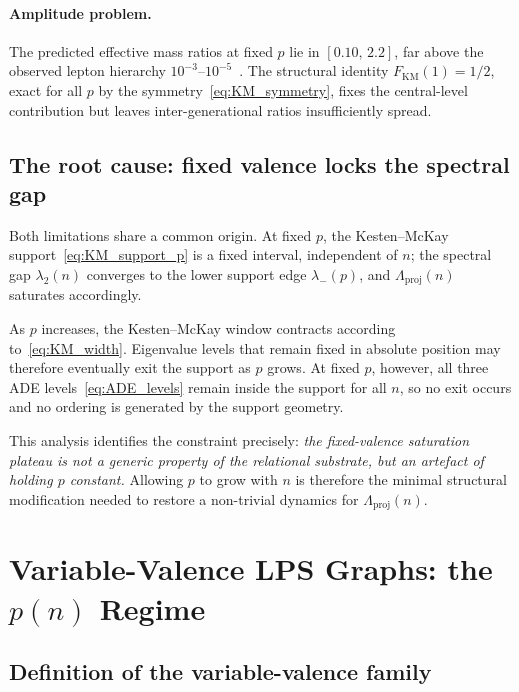 \documentclass[11pt]{article}
\newcommand{\Lproj}{\Lambda_{\mathrm{proj}}}
\newcommand{\FKM}{F_{\mathrm{KM}}}
\begin{document}
      \paragraph{Amplitude problem.}
        The predicted effective mass ratios at fixed $p$ lie in $[0.10,\, 2.2]$,
        far above the observed lepton hierarchy $10^{-3}$--$10^{-5}$~\cite{Beau2026a5}.
        The structural identity $\FKM(1) = 1/2$, exact for all $p$ by the
        symmetry~\eqref{eq:KM_symmetry}, fixes the central-level contribution but
        leaves inter-generational ratios insufficiently spread.

  \subsection{The root cause: fixed valence locks the spectral gap}
    \label{subsec:root_cause}

    Both limitations share a common origin.
    At fixed $p$, the Kesten--McKay support~\eqref{eq:KM_support_p} is a fixed
    interval, independent of $n$; the spectral gap $\lambda_2(n)$ converges to
    the lower support edge $\lambda_-(p)$, and $\Lproj(n)$ saturates accordingly.

    As $p$ increases, the Kesten--McKay window contracts according
    to~\eqref{eq:KM_width}.
    Eigenvalue levels that remain fixed in absolute position may therefore
    eventually exit the support as $p$ grows.
    At fixed $p$, however, all three ADE levels~\eqref{eq:ADE_levels} remain
    inside the support for all $n$, so no exit occurs and no ordering is generated
    by the support geometry.

    This analysis identifies the constraint precisely: \emph{the fixed-valence
  saturation plateau is not a generic property of the relational substrate,
    but an artefact of holding $p$ constant.}
    Allowing $p$ to grow with $n$ is therefore the minimal structural modification
    needed to restore a non-trivial dynamics for $\Lproj(n)$.

  \section{Variable-Valence LPS Graphs: the $p(n)$ Regime}
  \label{sec:variable_valence}

  \subsection{Definition of the variable-valence family}
    \label{subsec:family}
\end{document}
